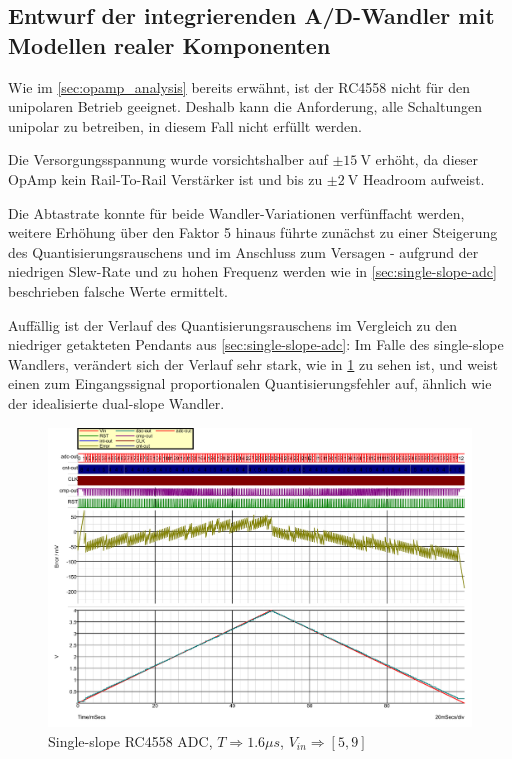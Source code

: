 \documentclass[
	ngerman,
	parskip=half,
	twocolumn,
	DIV=calc,
	]{scrartcl}
\begin{document}
		\subsection{Entwurf der integrierenden A/D-Wandler mit Modellen realer Komponenten}		
		
		Wie im \cref{sec:opamp_analysis} bereits erwähnt, ist der RC4558 nicht für den unipolaren Betrieb geeignet. Deshalb kann die Anforderung, alle Schaltungen unipolar zu betreiben, in diesem Fall nicht erfüllt werden. 
		
		Die Versorgungsspannung wurde vorsichtshalber auf $\pm \SI{15}{\volt} $ erhöht, da dieser OpAmp kein Rail-To-Rail Verstärker ist und bis zu $\pm \SI{2}{\volt} $ Headroom aufweist. 
		
		Die Abtastrate konnte für beide Wandler-Variationen verfünffacht werden, weitere Erhöhung über den Faktor 5 hinaus führte zunächst zu einer Steigerung des Quantisierungsrauschens und im Anschluss zum Versagen - aufgrund der niedrigen Slew-Rate und zu hohen Frequenz werden wie in \cref{sec:single-slope-adc} beschrieben falsche Werte ermittelt. 
		
		Auffällig ist der Verlauf des Quantisierungsrauschens im Vergleich zu den niedriger getakteten Pendants aus \cref{sec:single-slope-adc}: Im Falle des single-slope Wandlers, verändert sich der Verlauf sehr stark, wie in \cref{fig:single-slope-RC4558} zu sehen ist, und weist einen zum Eingangssignal proportionalen Quantisierungsfehler auf, ähnlich wie der idealisierte dual-slope Wandler.				
				
		\begin{figure}
			\centering
			\includegraphics[width=\linewidth]{RC4558_single_slope}
			\caption[Single-slope RC4558 ADC]{Single-slope RC4558 ADC, $T \Rightarrow 1.6\mu s$, $V_{in} \Rightarrow [5,  9]$}
			\label{fig:single-slope-RC4558}
		\end{figure}	
	
\end{document}

